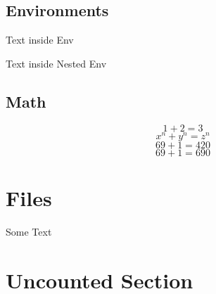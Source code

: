 \subsection{Environments}
\begin{Some_Env}
Text inside Env

\begin{Nested_Env}
Text inside Nested Env

\end{Nested_Env}
\end{Some_Env}
\subsection{Math}
\label{math}
$$1+2 = 3$$
\[x^n + y^n = z^n\]
\begin{displaymath}
69 + 1 = 420
\end{displaymath}
\begin{equation}
69 + 1 = 690
\end{equation}
\section{Files}
Some Text



\section*{Uncounted Section}

